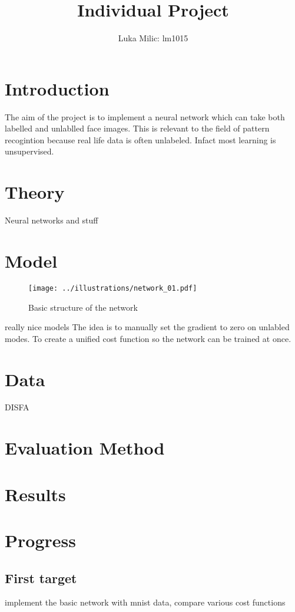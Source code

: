\documentclass[11pt]{article}
\title{Individual Project}
\author{Luka Milic: lm1015}
\begin{document}
\maketitle
\section{Introduction}
The aim of the project is to implement a neural network which can take both labelled and unlablled face images.
This is relevant to the field of pattern recogintion because real life data is often unlabeled. Infact most learning is unsupervised.
\section{Theory}
Neural networks and stuff
\section{Model}
\begin{figure}
  \begin{center}
    \texttt{[image: ../illustrations/network\_01.pdf]}
  \end{center}
  \caption{Basic structure of the network}
\end{figure}
really nice models
The idea is to manually set the gradient to zero on unlabled modes. To create a unified cost function so the network can be trained at once.
\section{Data}
DISFA
\section{Evaluation Method}
\section{Results}
\section{Progress}
\subsection{First target}
implement the basic network with mnist data, compare various cost functions
\end{document}
